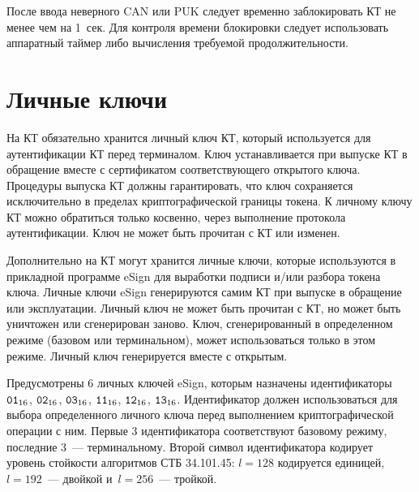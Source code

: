 После ввода неверного CAN или PUK следует временно заблокировать КТ не менее 
чем на 1~сек. Для контроля времени блокировки следует использовать аппаратный 
таймер либо вычисления требуемой продолжительности.

\section{Личные ключи}\label{OBJ.Keys}

На КТ обязательно хранится личный ключ КТ, который используется 
для аутентификации КТ перед терминалом. Ключ устанавливается при выпуске
КТ в обращение вместе с сертификатом соответствующего открытого ключа. 
Процедуры выпуска КТ должны гарантировать, что ключ сохраняется исключительно 
в пределах криптографической границы токена. К личному ключу КТ можно 
обратиться только косвенно, через выполнение протокола аутентификации. Ключ не 
может быть прочитан с КТ или изменен. 

Дополнительно на КТ могут хранится личные ключи, 
которые используются в прикладной программе eSign для выработки 
подписи и/или разбора токена ключа. Личные ключи eSign генерируются самим КТ 
при выпуске в обращение или эксплуатации. Личный ключ не может быть прочитан с КТ, 
но может быть уничтожен или сгенерирован заново. Ключ, сгенерированный в 
определенном режиме (базовом или терминальном), может использоваться только в 
этом режиме. Личный ключ генерируется вместе с открытым.

Предусмотрены 6 личных ключей eSign, которым назначены идентификаторы 
$\texttt{01}_{16}$, $\texttt{02}_{16}$, $\texttt{03}_{16}$, $\texttt{11}_{16}$, $\texttt{12}_{16}$, $\texttt{13}_{16}$.
%
Идентификатор должен использоваться для выбора определенного личного ключа 
перед выполнением криптографической операции с ним.
%
Первые 3 идентификатора соответствуют базовому режиму, последние 3~--- 
терминальному. Второй символ идентификатора кодирует уровень стойкости
алгоритмов СТБ 34.101.45: $l=128$ кодируется единицей, 
$l=192$~--- двойкой и~$l=256$~--- тройкой.

